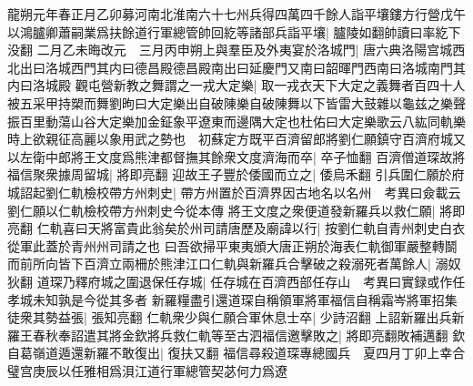 龍朔元年春正月乙卯募河南北淮南六十七州兵得四萬四千餘人詣平壤鏤方行營戊午以鴻臚卿蕭嗣業爲扶餘道行軍總管帥回紇等諸部兵詣平壤|{
	臚陵如翻帥讀曰率紇下没翻}
二月乙未晦改元　三月丙申朔上與羣臣及外夷宴於洛城門|{
	唐六典洛陽宫城西北出曰洛城西門其内曰德昌殿德昌殿南出曰延慶門又南曰韶暉門西南曰洛城南門其内曰洛城殿}
觀屯營新教之舞謂之一戎大定樂|{
	取一戎衣天下大定之義舞者百四十人被五采甲持槊而舞劉昫曰大定樂出自破陳樂自破陳舞以下皆雷大鼓雜以龜兹之樂聲振百里動蕩山谷大定樂加金鉦象平遼東而邊隅大定也杜佑曰大定樂歌云八紘同軌樂}
時上欲親征高麗以象用武之勢也　初蘇定方既平百濟留郎將劉仁願鎮守百濟府城又以左衛中郎將王文度爲熊津都督撫其餘衆文度濟海而卒|{
	卒子恤翻}
百濟僧道琛故將福信聚衆據周留城|{
	將即亮翻}
迎故王子豐於倭國而立之|{
	倭烏禾翻}
引兵圍仁願於府城詔起劉仁軌檢校帶方州刺史|{
	帶方州置於百濟界因古地名以名州　考異曰僉載云劉仁願以仁軌檢校帶方州刺史今從本傳}
將王文度之衆便道發新羅兵以救仁願|{
	將即亮翻}
仁軌喜曰天將富貴此翁矣於州司請唐歷及廟諱以行|{
	按劉仁軌自青州刺史白衣從軍此蓋於青州州司請之也}
曰吾欲掃平東夷頒大唐正朔於海表仁軌御軍嚴整轉鬬而前所向皆下百濟立兩柵於熊津江口仁軌與新羅兵合擊破之殺溺死者萬餘人|{
	溺奴狄翻}
道琛乃釋府城之圍退保任存城|{
	任存城在百濟西部任存山　考異曰實録或作任孝城未知孰是今從其多者}
新羅糧盡引還道琛自稱領軍將軍福信自稱霜岑將軍招集徒衆其勢益張|{
	張知亮翻}
仁軌衆少與仁願合軍休息士卒|{
	少詩沼翻}
上詔新羅出兵新羅王春秋奉詔遣其將金欽將兵救仁軌等至古泗福信邀擊敗之|{
	將即亮翻敗補邁翻}
欽自葛嶺道遁還新羅不敢復出|{
	復扶又翻}
福信尋殺道琛專總國兵　夏四月丁卯上幸合璧宫庚辰以任雅相爲浿江道行軍總管契苾何力爲遼

